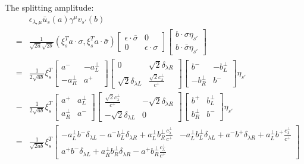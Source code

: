 The splitting amplitude:
\begin{eqnarray}
&&\epsilon_{\lambda, \mu} \bar{u}_s(a)\gamma^\mu v_{s'}(b)\\
&=&\frac{1}{\sqrt{2a}\sqrt{2b}}(\xi^T_s a\cdot\sigma, \xi^T_{s} a\cdot \bar{\sigma})
\begin{bmatrix}
\epsilon\cdot\bar{\sigma} & 0 \\
0 & \epsilon\cdot\sigma
\end{bmatrix}
\begin{bmatrix}
b\cdot\sigma \eta_{s'}\\
b\cdot\bar{\sigma} \eta_{s'}
\end{bmatrix}
\\
&=&\frac{1}{2\sqrt{ab}}
\xi_s^T
\begin{bmatrix}
a^- & -a^\perp_L \\
-a^\perp_R & a^+
\end{bmatrix}
\begin{bmatrix}
0 & \sqrt{2}\delta_{\lambda R}\\
\sqrt{2}\delta_{\lambda L} & \frac{\sqrt{2}c^\perp_\lambda}{c^+}
\end{bmatrix}
\begin{bmatrix}
b^- & -b^\perp_L \\
-b^\perp_R & b^-
\end{bmatrix}
\eta_{s'}\\\nonumber
&-&
\frac{1}{2\sqrt{ab}}
\xi_s^T
\begin{bmatrix}
a^+ & a^\perp_L \\
a^\perp_R & a^-
\end{bmatrix}
\begin{bmatrix}
\frac{\sqrt{2}c^\perp_\lambda}{c^+} & -\sqrt{2}\delta_{\lambda R}\\
-\sqrt{2}\delta_{\lambda L} & 0
\end{bmatrix}
\begin{bmatrix}
b^+ & b^\perp_L \\
b^\perp_R & b^-
\end{bmatrix}
\eta_{s'}
\\
&=&\frac{1}{\sqrt{2ab}}
\xi_s^T
\begin{bmatrix}
-a^\perp_L b^- \delta_{\lambda L} - a^- b^\perp_L \delta_{\lambda R} + a^\perp_L b^\perp_R\frac{c^\perp_\lambda}{c^+} &
-a^\perp_L b^\perp_L \delta_{\lambda L} + a^- b^+ \delta_{\lambda R} + a^\perp_L b^+\frac{c^\perp_\lambda}{c^+}
\\
a^+ b^- \delta_{\lambda L} + a^\perp_R b^\perp_R \delta_{\lambda R} - a^+ b^\perp_R\frac{c^\perp_\lambda}{c^+} &

\end{bmatrix}
\end{eqnarray}
